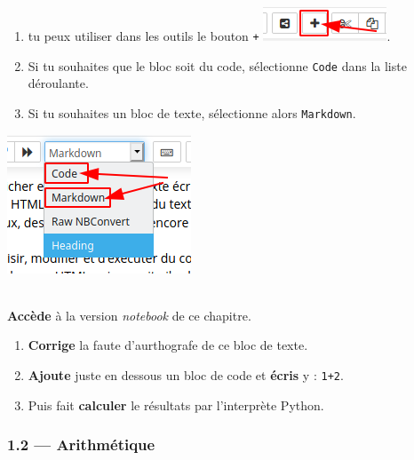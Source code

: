 \documentclass[a4paper,17pt]{extarticle}
\newenvironment{eleve}%
{\begin{activite}\color{noiramu}\\[-0.5cm]}
{\end{activite}}
\providecommand{\tightlist}{%
      \setlength{\itemsep}{0pt}\setlength{\parskip}{0pt}}
\begin{document}
\begin{enumerate}
\def\labelenumi{\arabic{enumi}.}
\tightlist
\item
  tu peux utiliser dans les outils le bouton \texttt{+}
  \includegraphics{res/tuto-01.png}.
\item
  Si tu souhaites que le bloc soit du code, sélectionne \texttt{Code}
  dans la liste déroulante.
\item
  Si tu souhaites un bloc de texte, sélectionne alors \texttt{Markdown}.
\end{enumerate}

\includegraphics{res/tuto-02.png}
\begin{eleve}
    \textbf{Accède} à la version \emph{notebook} de ce chapitre.

\begin{enumerate}
\def\labelenumi{\arabic{enumi}.}
\tightlist
\item
  \textbf{Corrige} la faute d'aurthografe de ce bloc de texte.
\item
  \textbf{Ajoute} juste en dessous un bloc de code et \textbf{écris} y :
  \texttt{1+2}.
\item
  Puis fait \textbf{calculer} le résultats par l'interprète Python.
\end{enumerate}
        
        \end{eleve}
    \hypertarget{arithmuxe9tique}{%
\subsubsection{1.2 --- Arithmétique}\label{arithmuxe9tique}}
\end{document}
